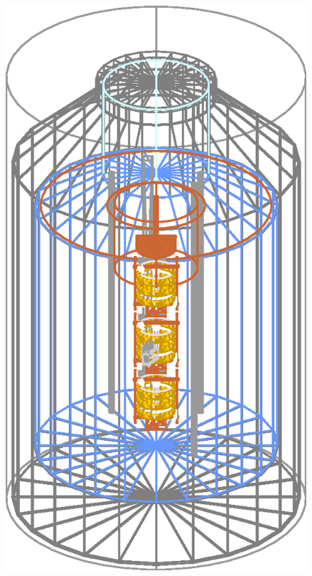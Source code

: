 \begin{figure}[tbhp]
{  \includegraphics[height=0.3\textheight,clip]{GIIwired}}
\subfloat[]{\label{fig:ph:s2}
}
\end{figure}
